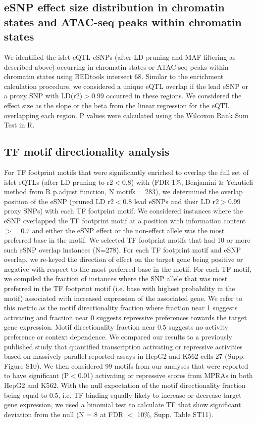 \subsection{eSNP effect size distribution in chromatin states and ATAC-seq peaks within chromatin states}
We identified the islet eQTL eSNPs (after LD pruning and MAF filtering as described above) occurring in chromatin states or ATAC-seq peaks within chromatin states using BEDtools intersect 68. Similar to the enrichment calculation procedure, we considered a unique eQTL overlap if the lead eSNP or a proxy SNP with LD(r2)$>$0.99 occurred in these regions. We considered the effect size as the slope or the beta from the linear regression for the eQTL overlapping each region. P values were calculated using the Wilcoxon Rank Sum Test in R.
    
\subsection{TF motif directionality analysis}
For TF footprint motifs that were significantly enriched to overlap the full set of islet eQTLs (after LD pruning to r2$<$0.8) with (FDR 1\%, Benjamini \& Yekutieli method from R p.adjust function, N motifs = 283), we determined the overlap position of the eSNP (pruned LD r2$<$0.8 lead eSNPs and their LD r2$>$0.99 proxy SNPs) with each TF footprint motif. We considered instances where the eSNP overlapped the TF footprint motif at a position with information content $>$= 0.7 and either the eSNP effect or the non-effect allele was the most preferred base in the motif. We selected TF footprint motifs that had 10 or more such eSNP overlap instances (N=278). For each TF footprint motif and eSNP overlap, we re-keyed the direction of effect on the target gene being positive or negative with respect to the most preferred base in the motif. For each TF motif, we compiled the fraction of instances where the SNP allele that was most preferred in the TF footprint motif (i.e. base with highest probability in the motif) associated with increased expression of the associated gene. We refer to this metric as the motif directionality fraction where fraction near 1 suggests activating and fraction near 0 suggests repressive preferences towards the target gene expression. Motif directionality fraction near 0.5 suggests no activity preference or context dependence.
We compared our results to a previously published study that quantified transcription activating or repressive activities based on massively parallel reported assays in HepG2 and K562 cells 27 (Supp. Figure S10). We then considered 99 motifs from our analyses that were reported to have significant (P$<$0.01) activating or repressive scores from MPRAs in both HepG2 and K562. With the null expectation of the motif directionality fraction being equal to 0.5, i.e. TF binding equally likely to increase or decrease target gene expression, we used a binomial test to calculate TF that show significant deviation from the null (N = 8 at FDR $<$ 10\%, Supp. Table ST11).

